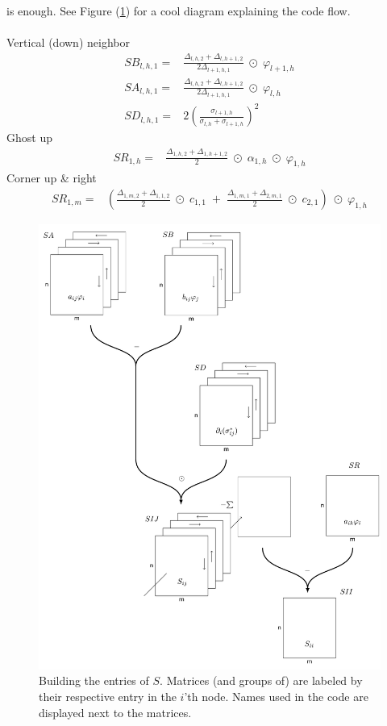 \documentclass[a4paper,12pt]{article}
\begin{document}
is enough. See Figure (\ref{fig:S}) for a cool diagram explaining the code flow.
\\\\
Vertical (down) neighbor
\begin{align*}
SB_{l,h,1} =&
 \frac{\Delta_{l,h,2} + \Delta_{l,h+1,2} } {2\Delta_{l+1,h,1} }  \; \odot \; 
 \varphi_{l+1,h} \\
SA_{l,h,1} =&
 \frac{\Delta_{l,h,2} + \Delta_{l,h+1,2} } {2\Delta_{l+1,h,1} }  \; \odot \; 
 \varphi_{l,h} \\
 SD_{l,h,1} =&
 2 \left (\frac{ \sigma_{l+1,h} }{\sigma_{l,h} + \sigma_{l+1,h}}\right)^2
\end{align*}
%
% 
Ghost up
\begin{align*}
SR_{1,h} =&
\frac{ \Delta_{1,h,2} + \Delta_{1,h+1,2}}{2}  \; \odot \;
\alpha_{1,h} \; \odot \;
\varphi_{1,h}
\end{align*}
Corner up \& right
\begin{align*}
SR_{1,m} =&
\left(
\frac{ \Delta_{1,m,2} + \Delta_{1,1,2}}{2}  \; \odot \;
c_{1,1} 
\; + \;
\frac{ \Delta_{1,m,1} + \Delta_{2,m,1}}{2}  \; \odot \;
c_{2,1}
\right)
\; \odot \;
\varphi_{1,h}
\end{align*}
%
\begin{figure}[!h]
\centering
\includegraphics[width=1\textwidth]{../pics/tikz/svg/S.pdf} 
\caption{Building the entries of $S$. Matrices (and groups of) are labeled by their respective entry in the 
$i$'th node. Names used in the code are displayed next to the matrices.}
\label{fig:S}
\end{figure}
\end{document}

